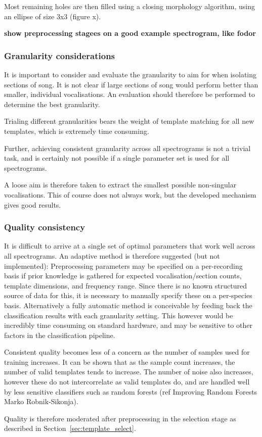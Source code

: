 Most remaining holes are then filled using a closing morphology algorithm,
using an ellipse of size 3x3 (figure x).

\textbf{show preprocessing stagees on a good example spectrogram, like fodor}

\subsubsection{Granularity considerations}\label{sec:granularity}
It is important to consider and evaluate the granularity to aim for when
isolating sections of song.
It is not clear if large sections of song would perform better than smaller,
individual vocalisations.
An evaluation should therefore be performed to determine the best granularity.

Trialing different granularities bears the weight of template matching for all
new templates, which is extremely time consuming.

Further, achieving consistent granularity across all spectrograms is not a trivial
task, and is certainly not possible if a single parameter set is used for
all spectrograms.

A loose aim is therefore taken to extract the smallest possible non-singular
vocalisations.
This of course does not always work, but the developed mechanism gives good
results.

\subsubsection{Quality consistency}
It is difficult to arrive at a single set of optimal parameters that work
well across all spectrograms.
An adaptive method is therefore suggested (but not implemented):
Preprocessing parameters may be specified on a per-recording basis if prior
knowledge is gathered for expected vocalisation/section counts, template
dimensions, and frequency range.
Since there is no known structured source of data for this, it is necessary to
manually specify these on a per-species basis.
Alternatively a fully automatic method is conceivable by feeding back the
classification results with each granularity setting.
This however would be incredibly time consuming on standard hardware, and may
be sensitive to other factors in the classification pipeline.

Consistent quality becomes less of a concern as the number of samples used for
training increases.
It can be shown that as the sample count increases, the number of valid templates
tends to increase.
The number of noise also increases, however these do not intercorrelate as valid
templates do, and are handled well by less sensitive classifiers such as
random forests (ref Improving Random Forests Marko Robnik-Sikonja).

Quality is therefore moderated after preprocessing in the selection stage as
described in Section~\ref{sec:template_select}.
